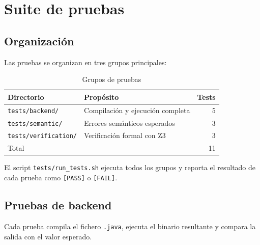 \chapter{Suite de pruebas}
\label{chap:pruebas}

\section{Organización}

Las pruebas se organizan en tres grupos principales:

\begin{table}[H]
  \centering
  \caption{Grupos de pruebas}
  \label{tab:grupos}
  \begin{tabular}{llr}
    \toprule
    \textbf{Directorio}            & \textbf{Propósito}                        & \textbf{Tests} \\
    \midrule
    \texttt{tests/backend/}        & Compilación y ejecución completa           & 5 \\
    \texttt{tests/semantic/}       & Errores semánticos esperados               & 3 \\
    \texttt{tests/verification/}   & Verificación formal con Z3                 & 3 \\
    \midrule
    Total                          &                                            & 11 \\
    \bottomrule
  \end{tabular}
\end{table}

El script \texttt{tests/run\_tests.sh} ejecuta todos los grupos y
reporta el resultado de cada prueba como \texttt{[PASS]} o \texttt{[FAIL]}.

\section{Pruebas de backend}

Cada prueba compila el fichero \texttt{.java}, ejecuta el binario
resultante y compara la salida con el valor esperado.

